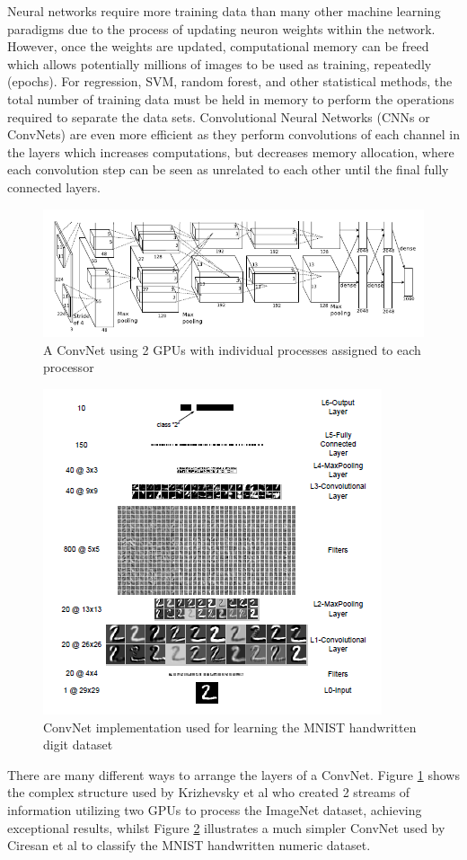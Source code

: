 \documentclass[fleqn,twoside,12pt]{report}
\begin{document}
Neural networks require more training data than many other machine learning paradigms due to the process of updating neuron weights within the network. However, once the weights are updated, computational memory can be freed which allows potentially millions of images to be used as training, repeatedly (epochs). For regression, SVM, random forest, and other statistical methods, the total number of training data must be held in memory to perform the operations required to separate the data sets. Convolutional Neural Networks (CNNs or ConvNets) are even more efficient as they perform convolutions of each channel in the layers which increases computations, but decreases memory allocation, where each convolution step can be seen as unrelated to each other until the final fully connected layers.


\begin{figure}[t]
	\centering
	\includegraphics[width=0.9\linewidth]{convnet1.png}
	\caption{A ConvNet using 2 GPUs with individual processes assigned to each processor}
	\label{fig:convnet1}
\end{figure}%


\begin{figure}[h]
	\centering
	\includegraphics[width=0.5\linewidth]{convnet2.png}
	\caption{ ConvNet implementation used for learning the MNIST handwritten digit dataset}
	\label{fig:convnet2}
\end{figure}%

There are many different ways to arrange the layers of a ConvNet. Figure \ref{fig:convnet1} shows the complex structure used by Krizhevsky et al \cite{krizhevsky} who created 2 streams of information utilizing two GPUs to process the ImageNet dataset, achieving exceptional results, whilst Figure \ref{fig:convnet2} illustrates a much simpler ConvNet used by Ciresan et al \cite{ciresan} to classify the MNIST handwritten numeric dataset. 
\end{document}

